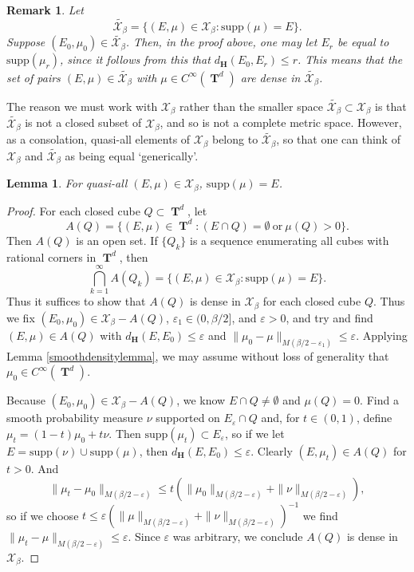 \documentclass[12pt,reqno]{article}
\numberwithin{equation}{section}
\DeclareMathOperator{\TT}{\mathbf{T}}
\newtheorem{lemma}[theorem]{Lemma}
\newtheorem{remark}[theorem]{Remark}
\numberwithin{theorem}{section}
\begin{document}
\begin{remark} \label{remarkDOIWJDIOWJ2}
    Let
    \[ \tilde{\mathcal{X}_\beta} = \{ (E,\mu) \in \mathcal{X}_\beta : \text{supp}(\mu) = E \}. \]
    Suppose $(E_0,\mu_0) \in \tilde{\mathcal{X}_\beta}$. Then, in the proof above, one may let $E_r$ be equal to $\text{supp}(\mu_r)$, since it follows from this that $d_\mathbf{H}(E_0,E_r) \leq r$. This means that the set of pairs $(E,\mu) \in \tilde{\mathcal{X}_\beta}$ with $\mu \in C^\infty(\TT^d)$ are dense in $\tilde{\mathcal{X}_\beta}$.
\end{remark}

The reason we must work with $\mathcal{X}_\beta$ rather than the smaller space $\tilde{\mathcal{X}_\beta} \subset \mathcal{X}_\beta$ is that $\tilde{\mathcal{X}_\beta}$ is not a closed subset of $\mathcal{X}_\beta$, and so is not a complete metric space. However, as a consolation, quasi-all elements of $\mathcal{X}_\beta$ belong to $\tilde{\mathcal{X}_\beta}$, so that one can think of $\mathcal{X}_\beta$ and $\tilde{\mathcal{X}_\beta}$ as being equal `generically'.

\begin{lemma} \label{lemmaOIJAWDIOJW23232}
    For quasi-all $(E,\mu) \in \mathcal{X}_\beta$, $\text{supp}(\mu) = E$.
\end{lemma}
\begin{proof}
    For each closed cube $Q \subset \TT^d$, let
    \[ A(Q) = \{ (E,\mu) \in \TT^d: (E \cap Q) = \emptyset\ \text{or}\ \mu(Q) > 0 \}. \]
    Then $A(Q)$ is an open set. If $\{ Q_k \}$ is a sequence enumerating all cubes with rational corners in $\TT^d$, then
    \[ \bigcap_{k = 1}^\infty A(Q_k) = \{ (E,\mu) \in \mathcal{X}_\beta : \text{supp}(\mu) = E \}. \]
    Thus it suffices to show that $A(Q)$ is dense in $\mathcal{X}_\beta$ for each closed cube $Q$. Thus we fix $(E_0,\mu_0) \in \mathcal{X}_\beta - A(Q)$, $\varepsilon_1 \in (0,\beta/2]$, and $\varepsilon > 0$, and try and find $(E,\mu) \in A(Q)$ with $d_\mathbf{H}(E,E_0) \leq \varepsilon$ and $\| \mu_0 - \mu \|_{M(\beta/2 - \varepsilon_1)} \leq \varepsilon$. Applying Lemma \ref{smoothdensitylemma}, we may assume without loss of generality that $\mu_0 \in C^\infty(\TT^d)$.

    Because $(E_0,\mu_0) \in \mathcal{X}_\beta - A(Q)$, we know $E \cap Q \neq \emptyset$ and $\mu(Q) = 0$. Find a smooth probability measure $\nu$ supported on $E_\varepsilon \cap Q$ and, for $t \in (0,1)$, define $\mu_t = (1 - t) \mu_0 + t \nu$. Then $\text{supp}(\mu_t) \subset E_\varepsilon$, so if we let $E = \text{supp}(\nu) \cup \text{supp}(\mu)$, then $d_\mathbf{H}(E,E_0) \leq \varepsilon$. Clearly $(E,\mu_t) \in A(Q)$ for $t > 0$. And
    \[ \| \mu_t - \mu_0 \|_{M(\beta/2 - \varepsilon)} \leq t \left( \| \mu_0 \|_{M(\beta/2 - \varepsilon)} + \| \nu \|_{M(\beta/2 - \varepsilon)} \right), \]
    so if we choose $t \leq \varepsilon (\| \mu \|_{M(\beta/2 - \varepsilon)} + \| \nu \|_{M(\beta/2 - \varepsilon)})^{-1}$ we find $\| \mu_t - \mu \|_{M(\beta/2 - \varepsilon)} \leq \varepsilon$. Since $\varepsilon$ was arbitrary, we conclude $A(Q)$ is dense in $\mathcal{X}_\beta$.
\end{proof}
\end{document}
